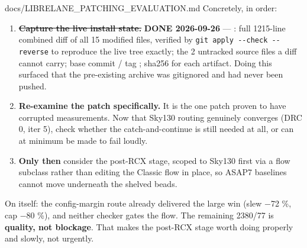 \begin{relocated}{docs/LIBRELANE_PATCHING_EVALUATION.md}
Concretely, in order:

\begin{enumerate}
\def\labelenumi{\arabic{enumi}.}
\tightlist
\item
  \sout{\textbf{Capture the live install state.}} \textbf{DONE
  2026-09-26} --- : full 1215-line combined
  diff of all 15 modified files, verified by
  \texttt{git\ apply\ -\allowbreak{}-\allowbreak{}check\ -\allowbreak{}-\allowbreak{}reverse}
  to reproduce the live tree exactly; the 2 untracked source files a
  diff cannot carry; base commit  / tag
  ; sha256 for each artifact. Doing this
  surfaced that the pre-existing archive was gitignored and had never
  been pushed.
\item
  \textbf{Re-examine the  patch specifically.} It is the
  one patch proven to have corrupted measurements. Now that Sky130
  routing genuinely converges (DRC 0, iter 5), check whether the
  catch-and-continue is still needed at all, or can at minimum be made
  to fail loudly.
\item
  \textbf{Only then} consider the post-RCX stage, scoped to Sky130 first
  via a flow subclass rather than editing the Classic flow in place, so
  ASAP7 baselines cannot move underneath the shelved beads.
\end{enumerate}

On  itself: the config-margin route already delivered the
large win (slew −72 \%, cap −80 \%), and neither checker gates the flow.
The remaining 2380/77 is \textbf{quality, not blockage}. That makes the
post-RCX stage worth doing properly and slowly, not urgently.
\end{relocated}

